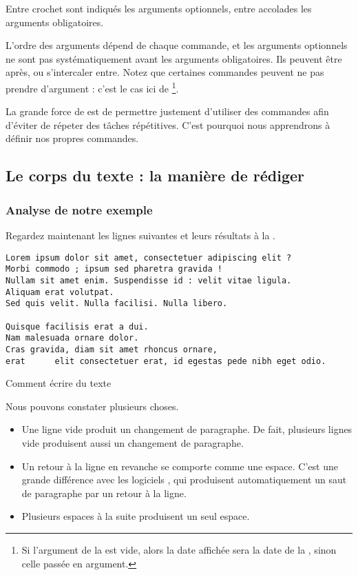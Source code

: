 Entre crochet sont indiqués les arguments optionnels, entre accolades les arguments obligatoires.




L'ordre des arguments dépend de chaque commande, et les arguments optionnels ne sont pas systématiquement avant les arguments obligatoires. Ils peuvent être après, ou s'intercaler entre. Notez que certaines commandes peuvent ne pas prendre d'argument : c'est le cas ici de \footnote{Si l'argument de la   est vide, alors la date affichée  sera la date de la , sinon celle passée en argument.}.

La grande force de \logiciel{\LaTex} est de permettre justement d'utiliser des commandes afin d'éviter de répeter des tâches répétitives. C'est pourquoi nous apprendrons à définir nos propres commandes.



\subsection{Le corps du texte : la manière de rédiger}

\subsubsection{Analyse de notre exemple}
Regardez maintenant les lignes suivantes et leurs résultats à la .

\begin{listing}[ht]
\begin{verbatim}
Lorem ipsum dolor sit amet, consectetuer adipiscing elit ?
Morbi commodo ; ipsum sed pharetra gravida !
Nullam sit amet enim. Suspendisse id : velit vitae ligula.
Aliquam erat volutpat.
Sed quis velit. Nulla facilisi. Nulla libero. 

Quisque facilisis erat a dui.
Nam malesuada ornare dolor.
Cras gravida, diam sit amet rhoncus ornare, 
erat      elit consectetuer erat, id egestas pede nibh eget odio.
\end{verbatim}
\caption{Comment écrire du texte}
\end{listing}

Nous pouvons constater plusieurs choses.
\begin{itemize}
\item Une ligne vide produit un changement de paragraphe. De fait, plusieurs lignes vide produisent aussi un changement de paragraphe.
\item Un retour à la ligne en revanche se comporte comme une espace. C'est une grande différence avec les logiciels , qui produisent automatiquement un saut de paragraphe par un retour à la ligne.
\item Plusieurs espaces à la suite produisent un seul espace. 
\end{itemize}

